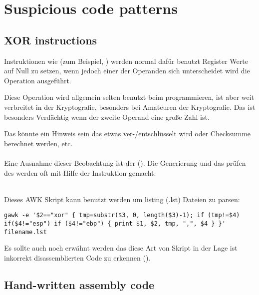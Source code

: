 \section{Suspicious code patterns}

\subsection{XOR instructions}

Instruktionen wie  (zum Beispiel, )
werden normal dafür benutzt Register Werte auf Null zu setzen, wenn jedoch
einer der Operanden sich unterscheidet wird die  Operation 
ausgeführt.

Diese Operation wird allgemein selten benutzt beim programmieren, ist aber 
weit verbreitet in der Kryptografie, besonders bei Amateuren der Kryptografie. %
Das ist besonders Verdächtig wenn der zweite Operand eine große Zahl ist.


Das könnte ein Hinweis sein das etwas ver-/entschlüsselt wird oder Checksumme berechnet werden, etc.\\
\\

Eine Ausnahme dieser Beobachtung ist der  (). 
Die Generierung und das prüfen des  werden oft mit Hilfe der \XOR Instruktion gemacht. \\
\\



Dieses AWK Skript kann benutzt werden um \IDA{} listing (.lst) Dateien zu parsen:

\begin{lstlisting}
gawk -e '$2=="xor" { tmp=substr($3, 0, length($3)-1); if (tmp!=$4) if($4!="esp") if ($4!="ebp") { print $1, $2, tmp, ",", $4 } }' filename.lst
\end{lstlisting}

Es sollte auch noch erwähnt werden das diese Art von Skript in der Lage ist inkorrekt disassemblierten Code zu erkennen
().

\subsection{Hand-written assembly code}

